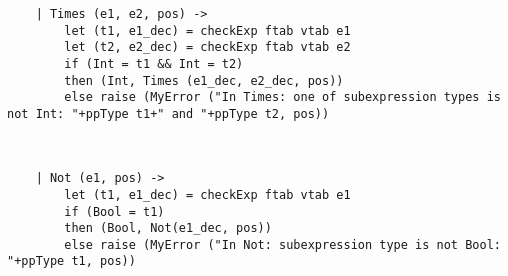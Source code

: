 \begin{comment}
    | Negate (e1, pos) ->
        let (t1, e1_dec) = checkExp ftab vtab e1
        if (Int= t1) 
        then (Int, Negate(e1_dec, pos))
        else raise (MyError ("In Negate: subexpression type is not Int: "+ppType t1, pos))
\end{comment}



\begin{verbatim}
    | Times (e1, e2, pos) ->
        let (t1, e1_dec) = checkExp ftab vtab e1
        let (t2, e2_dec) = checkExp ftab vtab e2
        if (Int = t1 && Int = t2)
        then (Int, Times (e1_dec, e2_dec, pos))
        else raise (MyError ("In Times: one of subexpression types is not Int: "+ppType t1+" and "+ppType t2, pos))
\end{verbatim}
~\\

\begin{comment}
    | Divide (e1, e2, pos) ->
        let (t1, e1_dec) = checkExp ftab vtab e1
        let (t2, e2_dec) = checkExp ftab vtab e2
        if (Int = t1 && Int = t2)
        then (Int, Divide(e1_dec, e2_dec, pos))
        else raise (MyError ("In Divide: one of subexpression types is not Int: "+ppType t1+" and "+ppType t2, pos))

    | And (e1, e2, pos) ->
        let (t1, e1_dec) = checkExp ftab vtab e1
        let (t2, e2_dec) = checkExp ftab vtab e2
        if (Bool = t1 && Bool = t2)
        then (Bool, And(e1_dec, e2_dec, pos))
        else raise (MyError ("In And: one of subexpression types is not Bool: "+ppType t1+" and "+ppType t2, pos))


    | Or (e1, e2, pos) ->
        let (t1, e1_dec) = checkExp ftab vtab e1
        let (t2, e2_dec) = checkExp ftab vtab e2
        if (Bool = t1 && Bool = t2)
        then (Bool, Or(e1_dec, e2_dec, pos))
        else raise (MyError ("In Or: one of subexpression types is not Bool: "+ppType t1+" and "+ppType t2, pos))
\end{comment}

\begin{verbatim}
    | Not (e1, pos) ->
        let (t1, e1_dec) = checkExp ftab vtab e1
        if (Bool = t1) 
        then (Bool, Not(e1_dec, pos))
        else raise (MyError ("In Not: subexpression type is not Bool: "+ppType t1, pos))
\end{verbatim}
~\\

\begin{comment}
    | Negate (e1, pos) ->
        let (t1, e1_dec) = checkExp ftab vtab e1
        if (Int= t1) 
        then (Int, Negate(e1_dec, pos))
        else raise (MyError ("In Negate: subexpression type is not Int: "+ppType t1, pos))
\end{comment}

